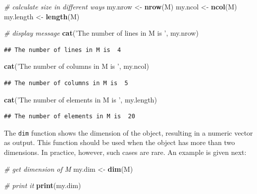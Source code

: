 \documentclass[11pt,]{book}
\newenvironment{Shaded}{\begin{snugshade}}{\end{snugshade}}
\newcommand{\KeywordTok}[1]{\textcolor[rgb]{0.27,0.27,0.27}{\textbf{#1}}}
\newcommand{\StringTok}[1]{\textcolor[rgb]{0.5,0.5,0.5}{#1}}
\newcommand{\CommentTok}[1]{\textcolor[rgb]{0.56,0.35,0.01}{\textit{#1}}}
\newcommand{\NormalTok}[1]{#1}
\begin{document}
\begin{Shaded}
\begin{Highlighting}[]
\CommentTok{# calculate size in different ways}
\NormalTok{my.nrow <-}\StringTok{ }\KeywordTok{nrow}\NormalTok{(M)}
\NormalTok{my.ncol <-}\StringTok{ }\KeywordTok{ncol}\NormalTok{(M)}
\NormalTok{my.length <-}\StringTok{ }\KeywordTok{length}\NormalTok{(M)}

\CommentTok{# display message }
\KeywordTok{cat}\NormalTok{(}\StringTok{'The number of lines in M is '}\NormalTok{, my.nrow)}
\end{Highlighting}
\end{Shaded}

\begin{verbatim}
## The number of lines in M is  4
\end{verbatim}

\begin{Shaded}
\begin{Highlighting}[]
\KeywordTok{cat}\NormalTok{(}\StringTok{'The number of columns in M is '}\NormalTok{, my.ncol)}
\end{Highlighting}
\end{Shaded}

\begin{verbatim}
## The number of columns in M is  5
\end{verbatim}

\begin{Shaded}
\begin{Highlighting}[]
\KeywordTok{cat}\NormalTok{(}\StringTok{'The number of elements in M is '}\NormalTok{, my.length)}
\end{Highlighting}
\end{Shaded}

\begin{verbatim}
## The number of elements in M is  20
\end{verbatim}

The \texttt{dim} function shows the dimension of the object, resulting
in a numeric vector as output. This function should be used when the
object has more than two dimensions. In practice, however, such cases
are rare. An example is given next:

\begin{Shaded}
\begin{Highlighting}[]
\CommentTok{# get dimension of M}
\NormalTok{my.dim <-}\StringTok{ }\KeywordTok{dim}\NormalTok{(M)}

\CommentTok{# print it}
\KeywordTok{print}\NormalTok{(my.dim)}
\end{Highlighting}
\end{Shaded}
\end{document}
